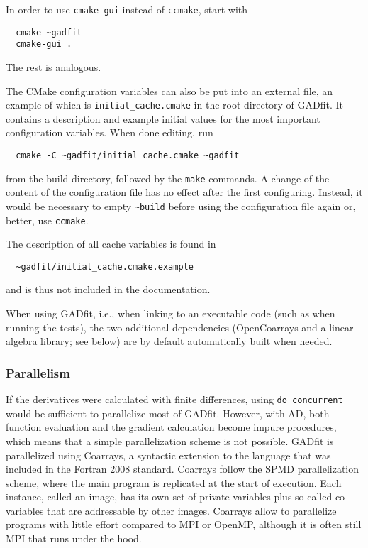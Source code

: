 \documentclass{article}
\begin{document}
In order to use \texttt{cmake-gui} instead of \texttt{ccmake}, start with
\begin{verbatim}
  cmake ~gadfit
  cmake-gui .
\end{verbatim}
The rest is analogous.

The CMake configuration variables can also be put into an external file, an example of which is \verb+initial_cache.cmake+ in the root directory of GADfit. It contains a description and example initial values for the most important configuration variables. When done editing, run
\begin{verbatim}
  cmake -C ~gadfit/initial_cache.cmake ~gadfit
\end{verbatim}
from the build directory, followed by the \texttt{make} commands. A change of the content of the configuration file has no effect after the first configuring. Instead, it would be necessary to empty \verb+~build+ before using the configuration file again or, better, use \texttt{ccmake}.

The description of all cache variables is found in
\begin{verbatim}
  ~gadfit/initial_cache.cmake.example
\end{verbatim}
and is thus not included in the documentation.

When using GADfit, i.e., when linking to an executable code (such as when running the tests), the two additional dependencies (OpenCoarrays and a linear algebra library; see below) are by default automatically built when needed.

\subsubsection{\label{sec:parallelism}Parallelism}

If the derivatives were calculated with finite differences, using \texttt{do concurrent} would be sufficient to parallelize most of GADfit. However, with AD, both function evaluation and the gradient calculation become impure procedures, which means that a simple parallelization scheme is not possible. GADfit is parallelized using Coarrays, a syntactic extension to the language that was included in the Fortran 2008 standard. Coarrays follow the SPMD parallelization scheme, where the main program is replicated at the start of execution. Each instance, called an image, has its own set of private variables plus so-called co-variables that are addressable by other images. Coarrays allow to parallelize programs with little effort compared to MPI or OpenMP, although it is often still MPI that runs under the hood.
\end{document}
